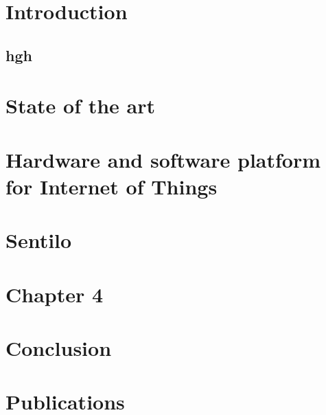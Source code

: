 \documentclass[a4paper, 12pt, twoside,openright]{report}
\begin{document}

%	
%	
%	
\cite{lundell_routing_2018b}

\body
	\chapter{Introduction}
		\section*{hgh}
		

	\chapter{State of the art}
	\minitoc
		
		
		
		
		

	\chapter{Hardware and software platform for Internet of Things}
	\minitoc
		
		
		
		
		
		

	\chapter{Sentilo}
	\minitoc
		
		
		
		
		
		

	\chapter{Chapter 4}
	\minitoc
		
		
		
		
		
		
		
	\chapter{Conclusion}
%		
		
	\chapter{Publications}
		
\end{document}
